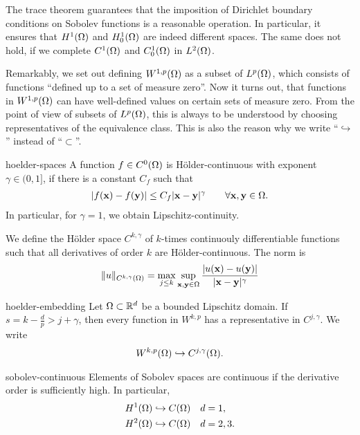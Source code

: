 \begin{remark}
  The trace theorem guarantees that the imposition of Dirichlet
  boundary conditions on Sobolev functions is a reasonable
  operation. In particular, it ensures that $H^1(\Omega)$ and
  $H^1_0(\Omega)$ are indeed different spaces. The same does not
  hold, if we complete $C^1(\Omega)$ and $C^1_0(\Omega)$ in
  $L^2(\Omega)$.

  Remarkably, we set out defining $W^{1,p}(\Omega)$ as a subset of
  $L^p(\Omega)$, which consists of functions ``defined up to a set of
  measure zero''. Now it turns out, that functions in
  $W^{1,p}(\Omega)$ can have well-defined values on certain sets of
  measure zero. From the point of view of subsets of $L^p(\Omega)$,
  this is always to be understood by choosing representatives of the
  equivalence class. This is also the reason why we write
  ``$\hookrightarrow$'' instead of ``$\subset$''.
\end{remark}

\begin{Definition}{hoelder-spaces}
  A function $f \in C^0(\Omega)$ is Hölder-continuous with exponent
  $\gamma \in (0,1]$, if there is a constant $C_f$ such that
  \begin{gather}
    \lvert f(\mathbf x)-f(\mathbf y)\rvert \le C_f \lvert\mathbf x-\mathbf y\rvert^\gamma \qquad\forall \mathbf x,\mathbf y\in\Omega.
  \end{gather}
  In particular, for $\gamma = 1$, we obtain Lipschitz-continuity.

  We define the Hölder space $C^{k,\gamma}$ of $k$-times continuouly
  differentiable functions such that all derivatives of order $k$ are
  Hölder-continuous. The norm is
  \begin{gather}
    \lVert u\rVert_{C^{k,\gamma}(\Omega)} = \max_{j\le k} \sup_{\mathbf x,\mathbf y\in\Omega}
    \frac{\lvert u(\mathbf x)-u(\mathbf y)\rvert}{\lvert\mathbf x-\mathbf y\rvert^\gamma}
  \end{gather}
\end{Definition}

\begin{Theorem}{hoelder-embedding}
  Let $\Omega\subset\mathbb R^d$ be a bounded Lipschitz domain.
  If $s = k-\tfrac dp > j+\gamma$, then every function in $W^{k,p}$ has a
  representative in $C^{j,\gamma}$. We write
  \begin{gather}
    W^{k,p}(\Omega) \hookrightarrow C^{j,\gamma}(\Omega).
  \end{gather}
\end{Theorem}

\begin{Corollary}{sobolev-continuous}
  Elements of Sobolev spaces are continuous if the derivative
  order is sufficiently high. In particular,
  \begin{gather}
    \begin{aligned}
      H^1(\Omega) & \hookrightarrow C(\Omega) & d&= 1, \\
      H^2(\Omega) & \hookrightarrow C(\Omega) & d&= 2,3.
    \end{aligned}
  \end{gather}
\end{Corollary}


